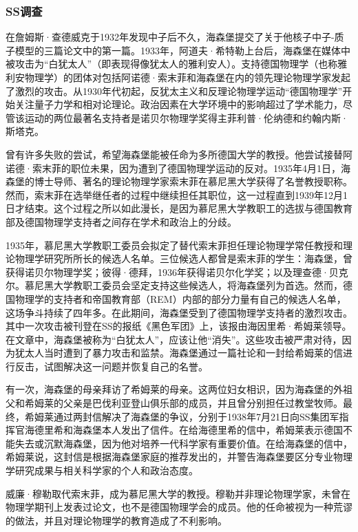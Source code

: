 \subsubsection{SS调查}
在詹姆斯·查德威克于1932年发现中子后不久，海森堡提交了关于他核子中子-质子模型的三篇论文中的第一篇。1933年，阿道夫·希特勒上台后，海森堡在媒体中被攻击为“白犹太人”（即表现得像犹太人的雅利安人）。支持德国物理学（也称雅利安物理学）的团体对包括阿诺德·索末菲和海森堡在内的领先理论物理学家发起了激烈的攻击。从1930年代初起，反犹太主义和反理论物理学运动“德国物理学”开始关注量子力学和相对论理论。政治因素在大学环境中的影响超过了学术能力，尽管该运动的两位最著名支持者是诺贝尔物理学奖得主菲利普·伦纳德和约翰内斯·斯塔克。

曾有许多失败的尝试，希望海森堡能被任命为多所德国大学的教授。他尝试接替阿诺德·索末菲的职位未果，因为遭到了德国物理学运动的反对。1935年4月1日，海森堡的博士导师、著名的理论物理学家索末菲在慕尼黑大学获得了名誉教授职称。然而，索末菲在选举继任者的过程中继续担任其职位，这一过程直到1939年12月1日才结束。这个过程之所以如此漫长，是因为慕尼黑大学教职工的选拔与德国教育部及德国物理学支持者之间存在学术和政治上的分歧。

1935年，慕尼黑大学教职工委员会拟定了替代索末菲担任理论物理学常任教授和理论物理学研究所所长的候选人名单。三位候选人都曾是索末菲的学生：海森堡，曾获得诺贝尔物理学奖；彼得·德拜，1936年获得诺贝尔化学奖；以及理查德·贝克尔。慕尼黑大学教职工委员会坚定支持这些候选人，将海森堡列为首选。然而，德国物理学的支持者和帝国教育部（REM）内部的部分力量有自己的候选人名单，这场争斗持续了四年多。在此期间，海森堡受到了德国物理学支持者的激烈攻击。其中一次攻击被刊登在SS的报纸《黑色军团》上，该报由海因里希·希姆莱领导。在文章中，海森堡被称为“白犹太人”，应该让他“消失”。这些攻击被严肃对待，因为犹太人当时遭到了暴力攻击和监禁。海森堡通过一篇社论和一封给希姆莱的信进行反击，试图解决这一问题并恢复自己的名誉。

有一次，海森堡的母亲拜访了希姆莱的母亲。这两位妇女相识，因为海森堡的外祖父和希姆莱的父亲是巴伐利亚登山俱乐部的成员，并且曾分别担任过教堂牧师。最终，希姆莱通过两封信解决了海森堡的争议，分别于1938年7月21日向SS集团军指挥官海德里希和海森堡本人发出了信件。在给海德里希的信中，希姆莱表示德国不能失去或沉默海森堡，因为他对培养一代科学家有重要价值。在给海森堡的信中，希姆莱说，这封信是根据海森堡家庭的推荐发出的，并警告海森堡要区分专业物理学研究成果与相关科学家的个人和政治态度。

威廉·穆勒取代索末菲，成为慕尼黑大学的教授。穆勒并非理论物理学家，未曾在物理学期刊上发表过论文，也不是德国物理学会的成员。他的任命被视为一种荒谬的做法，并且对理论物理学的教育造成了不利影响。

